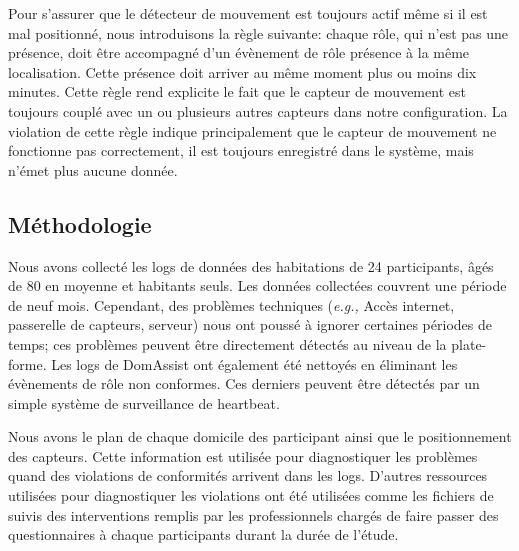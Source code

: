
Pour s'assurer que le détecteur de mouvement est toujours actif même si il est mal positionné, nous introduisons la règle suivante: chaque rôle, qui n'est pas une présence, doit être accompagné d'un évènement de rôle présence à la même localisation. Cette présence doit arriver au même moment plus ou moins dix minutes. Cette règle rend explicite le fait que le capteur de mouvement est toujours couplé avec un ou plusieurs autres capteurs dans notre configuration. La violation de cette règle indique principalement que le capteur de mouvement ne fonctionne pas correctement, il est toujours enregistré dans le système, mais n'émet plus aucune donnée.


\subsection{Méthodologie}\label{validation:methodology}
Nous avons collecté les logs de données des habitations de 24 participants, âgés de 80 en moyenne et habitants seuls. Les données collectées couvrent une période de neuf mois. Cependant, des problèmes techniques ({\em e.g.,} Accès internet, passerelle de capteurs, serveur) nous ont poussé à ignorer certaines périodes de temps; ces problèmes peuvent être directement détectés au niveau de la plate-forme. Les logs de DomAssist ont également été nettoyés en éliminant les évènements de rôle non conformes. Ces derniers peuvent être détectés par un simple système de surveillance de heartbeat.

Nous avons le plan de chaque domicile des participant ainsi que le positionnement des capteurs. Cette information est utilisée pour diagnostiquer les problèmes quand des violations de conformités arrivent dans les logs. D'autres ressources utilisées pour diagnostiquer les violations ont été utilisées comme les fichiers de suivis des interventions remplis par les professionnels chargés de faire passer des questionnaires à chaque participants durant la durée de l'étude.


